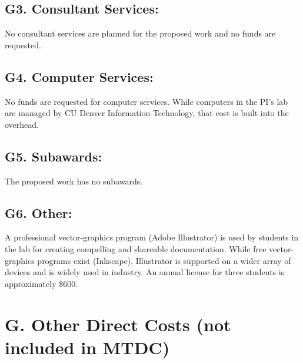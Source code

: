 \documentclass[11pt,oneside]{memoir}
\begin{document}
\subsection*{G3. Consultant Services:}
No consultant services are planned for the proposed work and no funds are requested.

\subsection*{G4. Computer Services:}
No funds are requested for computer services.  While computers in the PI's lab are managed by CU Denver Information Technology, that cost is built into the overhead.

\subsection*{G5. Subawards:}
The proposed work has no subawards.

\subsection*{G6. Other:}

A professional vector-graphics program (Adobe Illustrator) is used by students in the lab for creating compelling and shareable documentation.  While free vector-graphics programs exist (Inkscape), Illustrator is supported on a wider array of devices and is widely used in industry.  An annual license for three students is approximately \$600.


\section*{G. Other Direct Costs (not included in MTDC)}
%
\end{document}
